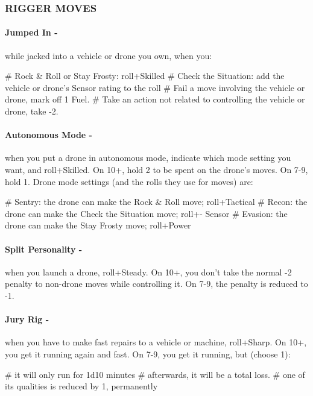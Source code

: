\subsubsection{RIGGER MOVES}
\paragraph{Jumped In -} while jacked into a vehicle or drone you own, when you:
    \begin{easylist}
        # Rock \& Roll or Stay Frosty: roll+Skilled
        # Check the Situation: add the vehicle or drone’s Sensor rating to the roll
        # Fail a move involving the vehicle or drone, mark off 1 Fuel.
        # Take an action not related to controlling the vehicle or drone, take -2.
    \end{easylist}

\paragraph{Autonomous Mode -} when you put a drone in autonomous mode, indicate which mode setting you want, and roll+Skilled. On 10+, hold 2 to be spent on the drone’s moves. On 7-9, hold 1. Drone mode settings (and the rolls they use for moves) are:
    \begin{easylist}
        # Sentry: the drone can make the Rock \& Roll move; roll+Tactical
        # Recon: the drone can make the Check the Situation move; roll+- Sensor
        # Evasion: the drone can make the Stay Frosty move; roll+Power
    \end{easylist}

\paragraph{Split Personality -} when you launch a drone, roll+Steady. On 10+, you don’t take the normal -2 penalty to non-drone moves while controlling it. On 7-9, the penalty is reduced to -1.

\paragraph{Jury Rig -} when you have to make fast repairs to a vehicle or machine, roll+Sharp. On 10+, you get it running again and fast. On 7-9, you get it running, but (choose 1):
    \begin{easylist}
        # it will only run for 1d10 minutes
        # afterwards, it will be a total loss.
        # one of its qualities is reduced by 1, permanently
    \end{easylist}

